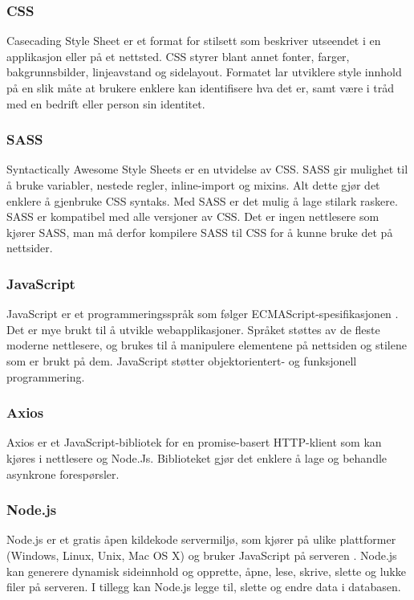 \subsubsection{CSS}
Casecading Style Sheet \cite{w3c2016hc} er et format for stilsett som beskriver utseendet i en applikasjon eller på et nettsted. CSS styrer blant annet fonter, farger, bakgrunnsbilder, linjeavstand og sidelayout. Formatet lar utviklere style innhold på en slik måte at brukere enklere kan identifisere hva det er, samt være i tråd med en bedrift eller person sin identitet.

\subsubsection{SASS}
Syntactically Awesome Style Sheets \cite{Catlin2006cws} er en utvidelse av CSS. SASS gir mulighet til å bruke variabler, nestede regler, inline-import og mixins. Alt dette gjør det enklere å gjenbruke CSS syntaks. Med SASS er det mulig å lage stilark raskere. SASS er kompatibel med alle versjoner av CSS. Det er ingen nettlesere som kjører SASS, man må derfor kompilere SASS til CSS for å kunne bruke det på nettsider.

\subsubsection{JavaScript}
JavaScript er et programmeringsspråk som følger ECMAScript-spesifikasjonen \cite{mdn2019jav}. Det er mye brukt til å utvikle webapplikasjoner. Språket støttes av de fleste moderne nettlesere, og brukes til å manipulere elementene på nettsiden og stilene som er brukt på dem. JavaScript støtter objektorientert- og funksjonell programmering.

\subsubsection{Axios}
\label{sec:tool:axios}
Axios\cite{axios2019a} er et JavaScript-bibliotek for en promise-basert HTTP-klient som kan kjøres i nettlesere og Node.Js. Biblioteket gjør det enklere å lage og behandle asynkrone forespørsler.

\subsubsection{Node.js}
Node.js er et gratis åpen kildekode servermiljø, som kjører på ulike plattformer (Windows, Linux, Unix, Mac OS X) og bruker JavaScript på serveren \cite{w3schools2019win}. Node.js kan generere dynamisk sideinnhold og opprette, åpne, lese, skrive, slette og lukke filer på serveren. I tillegg kan Node.js legge til, slette og endre data i databasen.

